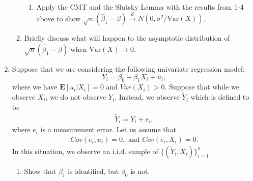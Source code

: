 \documentclass[11pt]{article}
\newcommand{\Blue}{\color{blue}}
\begin{document}
\begin{enumerate}
\begin{enumerate}
\begin{enumerate}
	\item Apply the CMT and the Slutsky Lemma with the results from 1-4 above to show $\sqrt{n}(\hat\beta_1-\beta)\overset{d}{\rightarrow} N(0,\sigma^2/\text{Var}(X))$. 
	\end{enumerate}

	\item Briefly discuss what will happen to the asymptotic distribution of $\sqrt{n}(\hat\beta_1-\beta)$ when $\text{Var}(X)\rightarrow 0$. 



\end{enumerate}


	\item Suppose that we are considering the following univariate regression
	model:
	\begin{equation*}
	Y_{i}=\beta_0 + \beta_1 X_i+u_{i},
	\end{equation*}%
	where we have $\mathbf{E}[u_{i}|X_{i}]=0$ and $Var(X_i) >0$. Suppose that while we observe $X_i$, we do not observe $Y_i$. Instead, we observe $\tilde Y_i$ which is defined to be
	\begin{eqnarray*}
		\tilde Y_i = Y_i + e_i,
	\end{eqnarray*}
where $e_i$ is a measurement error. Let us assume that
\begin{eqnarray*}
	Cov(e_i,u_i) = 0, \text{ and } Cov(e_i,X_i) = 0.
\end{eqnarray*}
In this situation, we observe an i.i.d. sample of $\{(\tilde Y_i,X_i)\}_{i=1}^n$.
\bigskip
\begin{enumerate}
\item Show that $\beta_1$ is identified, but $\beta_0$ is not.


\end{enumerate}
\end{enumerate}
\end{document}
